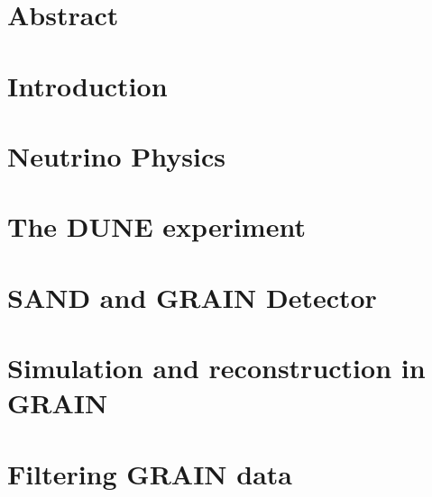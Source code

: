 \documentclass[12pt,a4paper,twoside]{book}
\begin{document}
\begin{titlepage}
    
\end{titlepage}
\myemptypage
\pagestyle{fancy}
\fancyhf{}
\renewcommand{\headrulewidth}{0pt}
\fancyfoot[C]{\thepage}
%
\setcounter{page}{1}
\chapter*{Abstract}

\cleardoublepage
\tableofcontents
\newpage
\pagestyle{fancy}
\fancyhf{}
\renewcommand{\headrulewidth}{0.5pt}
\setlength{\headheight}{15pt}
\fancyhead[LO]{\leftmark}%
\fancyhead[LE]{\thepage}%
\fancyhead[RO]{\thepage}%
\fancyhead[RE]{\nouppercase{\rightmark}}%
\fancyfoot{}
\chapter*{Introduction}

\chapter{Neutrino Physics}

\chapter{The DUNE experiment}

\chapter{SAND and GRAIN Detector}

\chapter{Simulation and reconstruction in GRAIN}

\chapter{Filtering GRAIN data}

\end{document}
